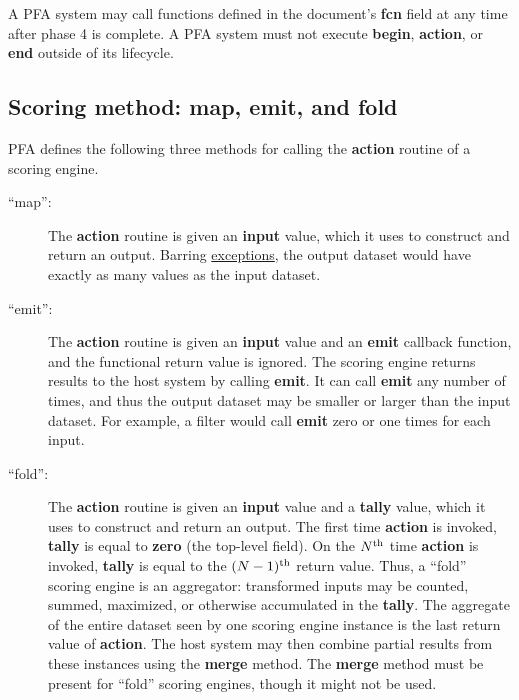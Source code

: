 \documentclass{article}
\newcommand{\PFAc}{\ttfamily\bfseries}
\newenvironment{allowedfields}%
  {\begin{center} \begin{minipage}{0.9\linewidth} \begin{description}}%
  {\end{description} \end{minipage} \end{center}}
\theoremstyle{definition}
\begin{document}
A PFA system may call functions defined in the document's {\PFAc fcn} field at any time after phase 4 is complete.  A PFA system must not execute {\PFAc begin}, {\PFAc action}, or {\PFAc end} outside of its lifecycle.

\hypertarget{hsec:method}{}
\subsection{Scoring method: map, emit, and fold}
\label{sec:method}

PFA defines the following three methods for calling the {\PFAc action} routine of a scoring engine.
\begin{allowedfields}
\item[``map'':] The {\PFAc action} routine is given an {\PFAc input} value, which it uses to construct and return an output.  Barring \hyperlink{hsec:exceptions}{exceptions}, the output dataset would have exactly as many values as the input dataset.
\end{allowedfields}
\begin{allowedfields}
\item[``emit'':] The {\PFAc action} routine is given an {\PFAc input} value and an {\PFAc emit} callback function, and the functional return value is ignored.  The scoring engine returns results to the host system by calling {\PFAc emit}.  It can call {\PFAc emit} any number of times, and thus the output dataset may be smaller or larger than the input dataset.  For example, a filter would call {\PFAc emit} zero or one times for each input.
\end{allowedfields}
\begin{allowedfields}
\item[``fold'':] The {\PFAc action} routine is given an {\PFAc input} value and a {\PFAc tally} value, which it uses to construct and return an output.  The first time {\PFAc action} is invoked, {\PFAc tally} is equal to {\PFAc zero} (the top-level field).  On the $N^{\mbox{\scriptsize th}}$ time {\PFAc action} is invoked, {\PFAc tally} is equal to the $(N - 1)^{\mbox{\scriptsize th}}$ return value.  Thus, a ``fold'' scoring engine is an aggregator: transformed inputs may be counted, summed, maximized, or otherwise accumulated in the {\PFAc tally}.  The aggregate of the entire dataset seen by one scoring engine instance is the last return value of {\PFAc action}.  The host system may then combine partial results from these instances using the {\PFAc merge} method.  The {\PFAc merge} method must be present for ``fold'' scoring engines, though it might not be used.
\end{allowedfields}
\end{document}
